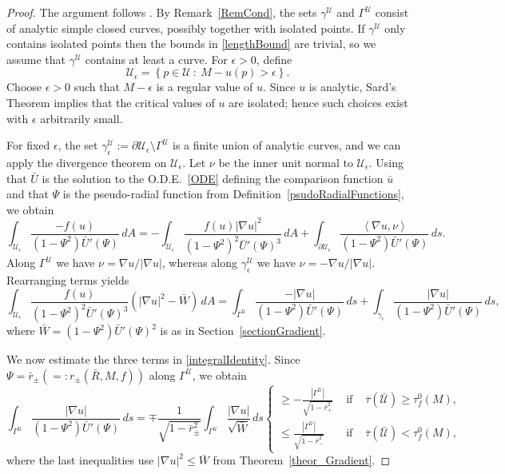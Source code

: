 \documentclass[11pt]{article}
\newcommand{\U}{\mathcal{U}}
\newcommand{\abs}[1]{\left\vert #1 \right\vert}
\newcommand{\set}[1]{\left\{#1\right\}}
\newcommand{\pscalar}[2]{\left\langle #1, #2 \right\rangle}
\numberwithin{equation} {section}
\begin{document}
\begin{proof}
The argument follows \cite[Proposition~4.3]{EMa}. By Remark~\ref{RemCond}, the sets $\gamma^{\U}$ and $\Gamma^{\U}$ consist of analytic simple closed curves, possibly together with isolated points. If $\gamma^{\U}$ only contains isolated points then the bounds in \eqref{lengthBound} are trivial, so we assume that $\gamma^\U$ contains at least a curve. For $\epsilon>0$, define
\[
\U_{\epsilon} = \set{p \in \U ~\colon~M-u(p)>\epsilon}.
\]
Choose $\epsilon>0$ such that $M-\epsilon$ is a regular value of $u$. Since $u$ is analytic, Sard's Theorem implies that the critical values of $u$ are isolated; hence such choices exist with $\epsilon$ arbitrarily small.

For fixed $\epsilon$, the set $\gamma_{\epsilon}^{\U}:=\partial \U_\epsilon \setminus \Gamma^\U$ is a finite union of analytic curves, and we can apply the divergence theorem on $\U_\epsilon$. Let $\nu$ be the inner unit normal to $\U_\epsilon$. Using that $\bar U$ is the solution to the O.D.E.~\eqref{ODE} defining the comparison function $\bar u$ and that $\Psi$ is the pseudo-radial function from Definition~\ref{psudoRadialFunctions}, we obtain
\[
\int_{\U_\epsilon} \frac{-f(u)}{(1-\Psi^2) \bar{U} ' (\Psi)} \, d A
= -\int_{\U_\epsilon} \frac{f(u) \abs{\nabla u}^2}{(1-\Psi^2)^{2} \bar{U}' (\Psi)^3}  \, dA
+\int_{\partial \U_\epsilon} \frac{\pscalar{\nabla u}{\nu}}{(1-\Psi^2)\bar{U}' (\Psi)} \, d s.
\]
Along $\Gamma^\U$ we have $\nu=\nabla u/\abs{\nabla u}$, whereas along $\gamma_\epsilon^{\U}$ we have $\nu=-\nabla u/\abs{\nabla u}$. Rearranging terms yields
\begin{equation}\label{integralIdentity}
	\int_{\U_\epsilon} \frac{f(u)}{(1-\Psi^2)^{2} \bar{U}' (\Psi)^3} (\abs{\nabla u}^2-\bar{W}) \, dA
	= \int_{\Gamma^\U} \frac{-\abs{\nabla u}}{(1-\Psi^2)\bar{U}' (\Psi)} \, d s
	+\int_{\gamma_\epsilon} \frac{\abs{\nabla u}}{(1-\Psi^2)\bar{U}' (\Psi)} \, d s,
\end{equation}
where $\bar W=(1-\Psi^2)\bar U'(\Psi)^2$ is as in Section~\ref{sectionGradient}.

We now estimate the three terms in \eqref{integralIdentity}. Since $\Psi=\bar r_\pm(=:r_\pm(\bar R,M,f))$ along $\Gamma^\U$, we obtain
\begin{equation}\label{1}
	\int_{\Gamma^\U} \frac{\abs{\nabla u }}{(1-\Psi^2) \bar{U}' (\Psi)} \, ds
	= \mp \frac{1}{\sqrt{1-\bar{r}_\pm^2}} \int_{\Gamma^\U} \frac{\abs{\nabla u}}{\sqrt{\bar W}} \, ds
	\left\{	\begin{matrix}
		\geq - \frac{\abs{\Gamma^\U}}{\sqrt{1-\bar{r}_+^2}} & \text{ if } & \overline{\tau} (\bar{\mathcal{U}}) \geq \tau_f^0 (M) ,\\[2mm]
		\leq \frac{\abs{\Gamma^\U}}{\sqrt{1-\bar{r}_-^2}} & \text{ if } & \overline{\tau} (\bar{\mathcal{U}}) < \tau_f^0 (M),
	\end{matrix}\right.
\end{equation}
where the last inequalities use $\abs{\nabla u}^2 \le \bar W$ from Theorem~\ref{theor_Gradient}.


\end{proof}
\end{document}
